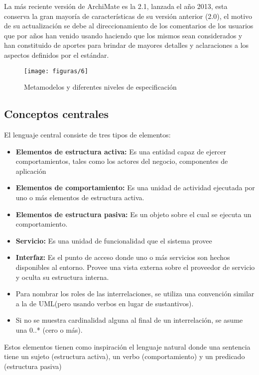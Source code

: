   La más reciente versión de ArchiMate es la 2.1, lanzada el año 2013, esta conserva la gran mayoría de características de su versión anterior (2.0), el motivo de su actualización se debe al direccionamiento de los comentarios de los usuarios que por años han venido usando haciendo que los mismos sean considerados y han constituido de aportes para brindar de mayores detalles y aclaraciones a los aspectos definidos por el estándar.
  
 \begin{figure}[H]
   	\centering
   	\texttt{[image: figuras/6]}
   	\captionsetup{width=.95\textwidth}
   	\caption{Metamodelos y diferentes niveles de especificación}
   	\label{figura6}
 \end{figure}
  
  \subsection{Conceptos centrales}
  El lenguaje central consiste de tres tipos de elementos:
    \begin{itemize}
	  \item \textbf{Elementos de estructura activa:} Es una entidad capaz de ejercer comportamientos, tales como los actores del negocio, componentes de aplicación
	  \item \textbf{Elementos de comportamiento:} Es una unidad de actividad ejecutada por uno o más elementos de estructura activa.
	  \item \textbf{Elementos de estructura pasiva:} Es un objeto sobre el cual se ejecuta un comportamiento.
	  \item \textbf{Servicio:} Es una unidad de funcionalidad que el sistema provee
	  \item \textbf{Interfaz:} Es el punto de acceso donde uno o más servicios son hechos disponibles al entorno. Provee una vista externa sobre el proveedor de servicio y oculta su estructura interna.
	  \item Para nombrar los roles de las interrelaciones, se utiliza una convención similar a la de UML(pero usando verbos en lugar de sustantivos).
	  \item Si no se muestra cardinalidad alguna al final de un interrelación, se asume una 0..* (cero o más).
    \end{itemize}
  Estos elementos tienen como inspiración el lenguaje natural donde una sentencia tiene un sujeto (estructura activa), un verbo (comportamiento) y un predicado (estructura pasiva)
  
